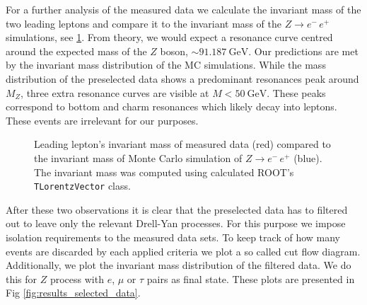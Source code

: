 \documentclass[11 pt]{article}
\begin{document}
For a further analysis of the measured data we calculate the invariant mass of the two leading leptons and compare it to the invariant mass of the $Z\to e^-\,e^+$ simulations, see \ref{fig:inv_mas}. From theory, we would expect a resonance curve centred around the expected mass of the $Z$ boson, $\sim \SI{91,187}{\giga\electronvolt}$. Our predictions are met by the invariant mass distribution of the MC simulations. While the mass distribution of the preselected data shows a predominant resonances peak around $M_Z$, three extra resonance curves are visible at $M< \SI{50}{\giga\electronvolt}$. These peaks correspond to bottom and charm resonances which likely decay into leptons. These events are irrelevant for our purposes. 
\begin{figure}[htbp]
    \centering
    \begin{subfigure}{0.5\textwidth}
        \centering
    \end{subfigure}
        \caption{\small Leading lepton's invariant mass of measured data (red) compared to the invariant mass of Monte Carlo simulation of $Z\to e^-\,e^+$ (blue). The invariant mass was computed using calculated ROOT's \texttt{TLorentzVector} class.}
        \label{fig:inv_mas}
\end{figure}

After these two observations it is clear that the preselected data has to filtered out to leave only the relevant Drell-Yan processes. For this purpose we impose isolation requirements to the measured data sets. To keep track of how many events are discarded by each applied criteria we plot a so called cut flow diagram. Additionally, we plot the invariant mass distribution of the filtered data. We do this for $Z$ process with $e$, $\mu$ or $\tau$ pairs as final state. These plots are presented in Fig \ref{fig:results_selected_data}. 
\end{document}
